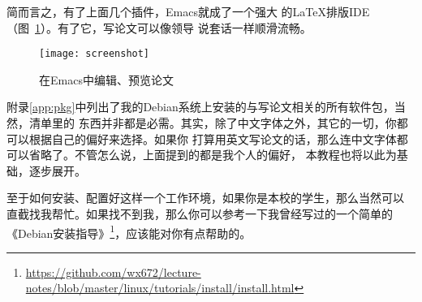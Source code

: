简而言之，有了上面几个插件，Emacs就成了一个强大
的\LaTeX{}排版IDE（图~\ref{fig:screenshot}）。有了它，写论文可以像领导
说套话一样顺滑流畅。

\begin{figure}[ht]
  \centering
  \begin{center}
    \texttt{[image: screenshot]}
  \end{center}
  \caption{在Emacs中编辑、预览论文\label{fig:screenshot}}  
\end{figure}

附录\ref{app:pkg}中列出了我的Debian系统上安装的与写论文相关的所有软件包，当然，清单里的
东西并非都是必需。其实，除了中文字体之外，其它的一切，你都可以根据自己的偏好来选择。如果你
打算用英文写论文的话，那么连中文字体都可以省略了。不管怎么说，上面提到的都是我个人的偏好，
本教程也将以此为基础，逐步展开。

至于如何安装、配置好这样一个工作环境，如果你是本校的学生，那么当然可以
直截找我帮忙。如果找不到我，那么你可以参考一下我曾经写过的一个简单的%
《Debian安装指导》\footnote{%
  \url{https://github.com/wx672/lecture-notes/blob/master/linux/tutorials/install/install.html}}，应该能对你有点帮助的。

